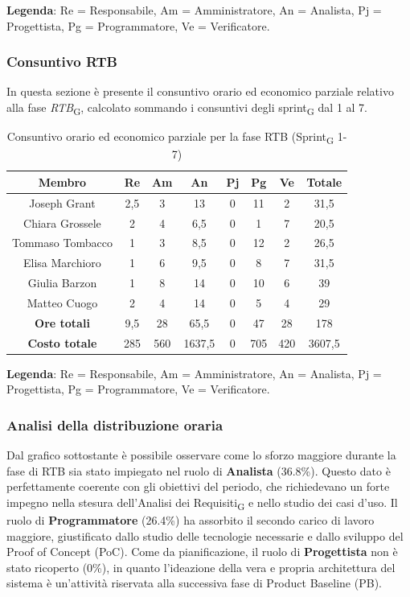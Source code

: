 \documentclass[11pt,a4paper]{article}
\newcommand{\gls}[1]{#1\textsubscript{G}}
\begin{document}
\textbf{Legenda}: Re = Responsabile, Am = Amministratore, An = Analista, Pj = Progettista, Pg = Programmatore, Ve = Verificatore.

\subsubsection{Consuntivo RTB}
In questa sezione è presente il consuntivo orario ed economico parziale relativo alla fase \textit{RTB}\textsubscript{G}, calcolato sommando i consuntivi degli \gls{sprint} dal 1 al 7.

\begin{table}[H]
    \centering
    \begin{tabular}{|c|c|c|c|c|c|c|c|}
        \hline
        \textbf{Membro} & \textbf{Re} & \textbf{Am} & \textbf{An} & \textbf{Pj} & \textbf{Pg} & \textbf{Ve} & \textbf{Totale} \\
        \hline
        Joseph Grant & 2,5 & 3 & 13 & 0 & 11 & 2 & 31,5 \\
        Chiara Grossele & 2 & 4 & 6,5 & 0 & 1 & 7 & 20,5 \\
        Tommaso Tombacco & 1 & 3 & 8,5 & 0 & 12 & 2 & 26,5 \\
        Elisa Marchioro & 1 & 6 & 9,5 & 0 & 8 & 7 & 31,5 \\
        Giulia Barzon & 1 & 8 & 14 & 0 & 10 & 6 & 39 \\
        Matteo Cuogo & 2 & 4 & 14 & 0 & 5 & 4 & 29 \\
        \hline
        \textbf{Ore totali} & 9,5 & 28 & 65,5 & 0 & 47 & 28 & 178 \\
        \hline
        \textbf{Costo totale} & 285 & 560 & 1637,5 & 0 & 705 & 420 & 3607,5 \\
        \hline
    \end{tabular}
    \caption{Consuntivo orario ed economico parziale per la fase RTB (\gls{Sprint} 1-7)}
\end{table}

\textbf{Legenda}: Re = Responsabile, Am = Amministratore, An = Analista, Pj = Progettista, Pg = Programmatore, Ve = Verificatore.


\subsubsection{Analisi della distribuzione oraria}
Dal grafico sottostante è possibile osservare come lo sforzo maggiore durante la fase di RTB sia stato impiegato nel ruolo di \textbf{Analista} (36.8\%). Questo dato è perfettamente coerente con gli obiettivi del periodo, che richiedevano un forte impegno nella stesura dell'\gls{Analisi dei Requisiti} e nello studio dei casi d'uso. 
Il ruolo di \textbf{Programmatore} (26.4\%) ha assorbito il secondo carico di lavoro maggiore, giustificato dallo studio delle tecnologie necessarie e dallo sviluppo del Proof of Concept (PoC).
Come da pianificazione, il ruolo di \textbf{Progettista} non è stato ricoperto (0\%), in quanto l'ideazione della vera e propria architettura del sistema è un'attività riservata alla successiva fase di Product Baseline (PB).
\end{document}
